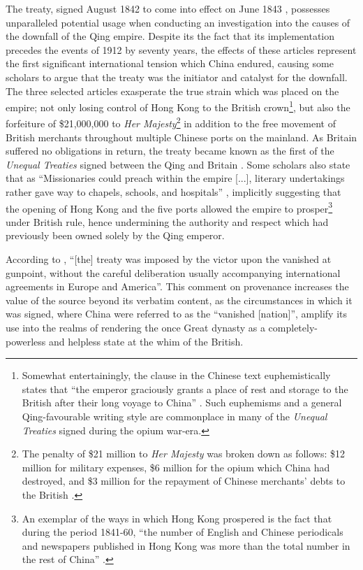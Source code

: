 \documentclass{article}
\begin{document}

The treaty, signed  August 1842 to come into effect on  June 1843
\autocite{Saw:1975}, possesses unparalleled potential usage when conducting an investigation into the causes of the downfall of the Qing empire. Despite its the fact that its implementation precedes the events of 1912 by seventy years, the effects of these articles represent the first significant international tension which China endured, causing some scholars to argue that the treaty was the initiator and catalyst for the downfall. The three selected articles exasperate the true strain which was placed on the empire; not only losing control of Hong Kong to the British crown\footnote{Somewhat entertainingly, the clause in the Chinese text euphemistically states that ``the emperor graciously grants a place of rest and storage to the British after their long voyage to China''
\autocite{Zhang:2007}. Such euphemisms and a general Qing-favourable writing style are commonplace in many of the \textit{Unequal Treaties} signed during the opium war-era.}, but also the forfeiture of \$21,000,000 to \textit{Her Majesty}\footnote{The penalty of \$21 million to \textit{Her Majesty} was broken down as follows: \$12 million for military expenses, \$6 million for the opium which China had destroyed, and \$3 million for the repayment of Chinese merchants' debts to the British
\autocite{Hsu:1999}.} in addition to the free movement of British merchants throughout multiple Chinese ports on the mainland. As Britain suffered no obligations in return, the treaty became known as the first of the \textit{Unequal Treaties} signed between the Qing and Britain
\autocite{Hoe:1999}. Some scholars also state that as ``Missionaries could preach within the empire [...], literary undertakings rather gave way to chapels, schools, and hospitals''
\autocite{Britton:1933}, implicitly suggesting that the opening of Hong Kong and the five ports allowed the empire to prosper\footnote{An exemplar of the ways in which Hong Kong prospered is the fact that during the period 1841-60, ``the number of English and Chinese periodicals and newspapers published in Hong Kong was more than the total number in the rest of China''
\autocite{Huang:2001}.} under British rule, hence undermining the authority and respect which had previously been owned solely by the Qing emperor.

According to
\autocite{Hsu:1999}, ``[the] treaty was imposed by the victor upon the vanished at gunpoint, without the careful deliberation usually accompanying international agreements in Europe and America''. This comment on provenance increases the value of the source beyond its verbatim content, as the circumstances in which it was signed, where China were referred to as the ``vanished [nation]'', amplify its use into the realms of rendering the once Great dynasty as a completely-powerless and helpless state at the whim of the British.
\end{document}
